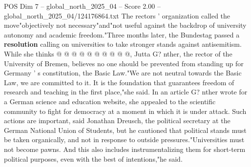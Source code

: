 \begin{textsample}{POS Dim 7 – global\_north\_2025\_04 – Score 2.00 – global\_north\_2025\_04/124176864.txt}
The rectors ' organization called the move"objectively not necessary"and"not useful against the backdrop of university autonomy and academic freedom."Three months later, the Bundestag passed a \textbf{resolution} calling on universities to take stronger stands against antisemitism.
While she thinks @ @ @ @ @ @ @ @ @ @, Jutta G? nther, the rector of the University of Bremen, believes no one should be prevented from standing up for Germany ' s constitution, the Basic Law."We are not neutral towards the Basic Law, we are committed to it.
It is the foundation that guarantees freedom of research and teaching in the first place,"she said.
In an article G? nther wrote for a German science and education website, she appealed to the scientific community to fight for democracy at a moment in which it is under attack.
Such actions are important, said Jonathan Dreusch, the political secretary at the German National Union of Students, but he cautioned that political stands must be taken organically, and not in response to outside pressures."Universities must not become pawns.
And this also includes instrumentalizing them for short-term political purposes, even with the best of intentions,"he said.

\end{textsample}
